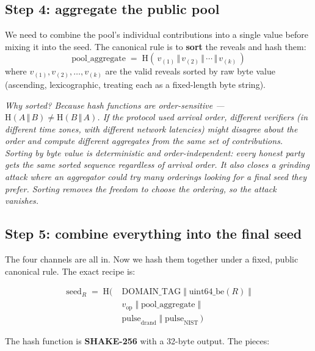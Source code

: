 \documentclass[11pt]{article}
\newenvironment{aside}{\par\medskip\noindent\itshape\small\color{black!70}}{\normalfont\par\medskip}
\newcommand{\formula}[1]{\[\boxed{#1}\]}
\newcommand{\Hash}{\mathrm{H}}
\begin{document}
\subsection*{Step 4: aggregate the public pool}

We need to combine the pool's individual contributions into a single value before mixing it into the seed. The canonical rule is to \textbf{sort} the reveals and hash them:
\formula{
\text{pool\_aggregate} \;=\; \Hash\!\left(\,v_{(1)} \,\Vert\, v_{(2)} \,\Vert\, \cdots \,\Vert\, v_{(k)}\,\right)
}
where $v_{(1)}, v_{(2)}, \ldots, v_{(k)}$ are the valid reveals sorted by raw byte value (ascending, lexicographic, treating each as a fixed-length byte string).

\begin{aside}
Why sorted? Because hash functions are order-sensitive --- $\Hash(A \,\Vert\, B) \neq \Hash(B \,\Vert\, A)$. If the protocol used arrival order, different verifiers (in different time zones, with different network latencies) might disagree about the order and compute different aggregates from the same set of contributions. Sorting by byte value is deterministic and order-independent: every honest party gets the same sorted sequence regardless of arrival order. It also closes a grinding attack where an aggregator could try many orderings looking for a final seed they prefer. Sorting removes the freedom to choose the ordering, so the attack vanishes.
\end{aside}

\subsection*{Step 5: combine everything into the final seed}

The four channels are all in. Now we hash them together under a fixed, public canonical rule. The exact recipe is:

\formula{
\begin{aligned}
\text{seed}_R \;=\; \Hash\Big(\;&\text{DOMAIN\_TAG} \;\Vert\; \text{uint64\_be}(R) \;\Vert \\
&v_{\text{op}} \;\Vert\; \text{pool\_aggregate} \;\Vert \\
&\text{pulse}_{\text{drand}} \;\Vert\; \text{pulse}_{\text{NIST}}\,\Big)
\end{aligned}
}

The hash function is \textbf{SHAKE-256} with a 32-byte output. The pieces:
\end{document}
